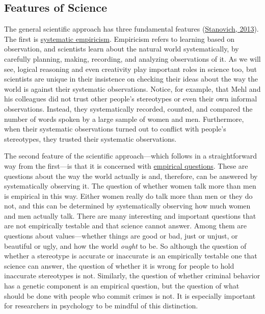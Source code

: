 \documentclass[
]{krantz}
\begin{document}
\hypertarget{features-of-science}{%
\subsection*{Features of Science}\label{features-of-science}}


The general scientific approach has three fundamental features (\protect\hyperlink{ref-stanovich2013think}{Stanovich, 2013}). The first is \protect\hyperlink{systematic-empiricism}{systematic empiricism}. Empiricism refers to learning based on observation, and scientists learn about the natural world systematically, by carefully planning, making, recording, and analyzing observations of it. As we will see, logical reasoning and even creativity play important roles in science too, but scientists are unique in their insistence on checking their ideas about the way the world is against their systematic observations. Notice, for example, that Mehl and his colleagues did not trust other people's stereotypes or even their own informal observations. Instead, they systematically recorded, counted, and compared the number of words spoken by a large sample of women and men. Furthermore, when their systematic observations turned out to conflict with people's stereotypes, they trusted their systematic observations.

The second feature of the scientific approach---which follows in a straightforward way from the first---is that it is concerned with \protect\hyperlink{empirical-question}{empirical questions}. These are questions about the way the world actually is and, therefore, can be answered by systematically observing it. The question of whether women talk more than men is empirical in this way. Either women really do talk more than men or they do not, and this can be determined by systematically observing how much women and men actually talk. There are many interesting and important questions that are not empirically testable and that science cannot answer. Among them are questions about values---whether things are good or bad, just or unjust, or beautiful or ugly, and how the world \emph{ought} to be. So although the question of whether a stereotype is accurate or inaccurate is an empirically testable one that science can answer, the question of whether it is wrong for people to hold inaccurate stereotypes is not. Similarly, the question of whether criminal behavior has a genetic component is an empirical question, but the question of what should be done with people who commit crimes is not. It is especially important for researchers in psychology to be mindful of this distinction.
\end{document}
